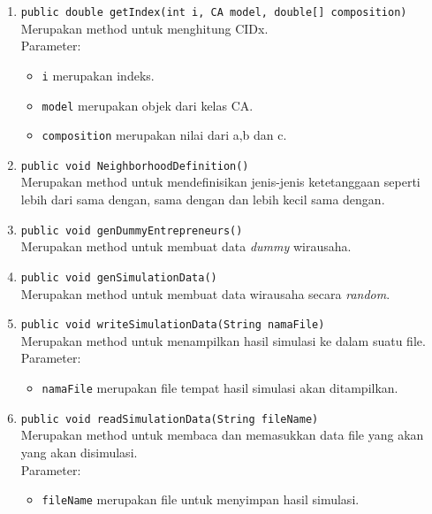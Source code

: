 \begin{enumerate}
			\item \texttt{public double getIndex(int i, CA model, double[] composition)}\\
			Merupakan method untuk menghitung CIDx.\\
			Parameter:
			\begin{itemize}
				\item \texttt{i} merupakan indeks.
				\item \texttt{model} merupakan objek dari kelas CA.
				\item \texttt{composition} merupakan nilai dari a,b dan c.
			\end{itemize}
			
			\item \texttt{public void NeighborhoodDefinition()}\\
			Merupakan method untuk mendefinisikan jenis-jenis ketetanggaan seperti lebih dari sama dengan, sama dengan dan lebih kecil sama dengan.\\
			
			\item \texttt{public void genDummyEntrepreneurs()}\\
			Merupakan method untuk membuat data \textit{dummy} wirausaha.
			
			\item \texttt{public void genSimulationData()}\\
			Merupakan method untuk membuat data wirausaha secara \textit{random}.
			
			\item \texttt{public void writeSimulationData(String namaFile)}\\
			Merupakan method untuk menampilkan hasil simulasi ke dalam suatu file.\\
			Parameter:
			\begin{itemize}
				\item \texttt{namaFile} merupakan file tempat hasil simulasi akan ditampilkan.
			\end{itemize}
			
			\item \texttt{public void readSimulationData(String fileName)}\\
			Merupakan method untuk membaca dan memasukkan data file yang akan yang akan disimulasi.\\
			Parameter:
				\begin{itemize}
				\item \texttt{fileName} merupakan file untuk menyimpan hasil simulasi.
			\end{itemize}
			

\end{enumerate}
